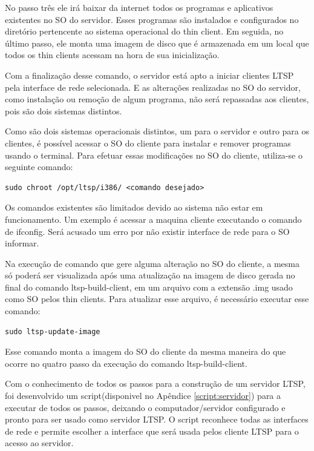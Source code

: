 \documentclass[
	12pt,				%
	openright,			%
	twoside,			%
	a4paper,			%
	chapter=TITLE,		%
	english,			%
	brazil				%
	]{abntex2}
\begin{document}
No passo três ele irá baixar da internet todos os programas e aplicativos existentes no SO do servidor. Esses programas são instalados e configurados no diretório pertencente ao sistema operacional do thin client.  Em seguida, no último passo, ele monta uma imagem de disco que é armazenada em um local que todos os thin clients acessam na hora de sua inicialização.

Com a finalização desse comando, o servidor está apto a iniciar clientes LTSP pela interface de rede selecionada. E as alterações realizadas no SO do servidor, como instalação ou remoção de algum programa, não será repassadas aos clientes, pois são dois sistemas distintos.

Como são dois sistemas operacionais distintos, um para o servidor e outro para os clientes, é possível acessar o SO do cliente para instalar e remover programas usando o terminal. Para efetuar essas modificações no SO do cliente, utiliza-se o seguinte comando:

\begin{verbatim}
sudo chroot /opt/ltsp/i386/ <comando desejado>
\end{verbatim}

Os comandos existentes são limitados devido ao sistema não estar em funcionamento. Um exemplo é acessar a maquina cliente executando o comando de ifconfig. Será acusado um erro por não existir interface de rede para o SO informar.

Na execução de comando que gere alguma alteração no SO do cliente, a mesma só poderá ser visualizada após uma atualização na imagem de disco gerada no final do comando ltsp-build-client, em um arquivo com a extensão .img usado como SO pelos thin clients. Para atualizar esse arquivo, é necessário executar esse comando:

\begin{verbatim}
sudo ltsp-update-image
\end{verbatim}

Esse comando monta a imagem do SO do cliente da mesma maneira do que ocorre no quatro passo da execução do comando  ltsp-build-client.

Com o conhecimento de todos os passos para a construção de um servidor LTSP, foi desenvolvido um script(disponivel no Apêndice \ref{script:servidor}) para a executar de todos os passos, deixando o computador/servidor configurado e pronto para ser usado como servidor LTSP. O script reconhece todas as interfaces de rede e permite escolher a interface que será usada pelos cliente LTSP para o acesso ao servidor. 
\end{document}
